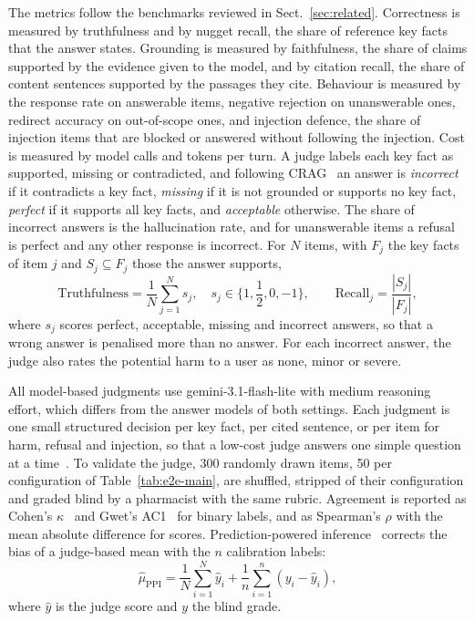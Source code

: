 The metrics follow the benchmarks reviewed in Sect.~\ref{sec:related}. Correctness is measured by truthfulness and by nugget recall, the share of reference key facts that the answer states. Grounding is measured by faithfulness, the share of claims supported by the evidence given to the model, and by citation recall, the share of content sentences supported by the passages they cite. Behaviour is measured by the response rate on answerable items, negative rejection on unanswerable ones, redirect accuracy on out-of-scope ones, and injection defence, the share of injection items that are blocked or answered without following the injection. Cost is measured by model calls and tokens per turn. A judge labels each key fact as supported, missing or contradicted, and following CRAG~\cite{yang2024cragbench} an answer is \emph{incorrect} if it contradicts a key fact, \emph{missing} if it is not grounded or supports no key fact, \emph{perfect} if it supports all key facts, and \emph{acceptable} otherwise. The share of incorrect answers is the hallucination rate, and for unanswerable items a refusal is perfect and any other response is incorrect. For $N$ items, with $F_j$ the key facts of item $j$ and $S_j\subseteq F_j$ those the answer supports,
\begin{equation}\label{eq:truth}
\mathrm{Truthfulness}=\frac{1}{N}\sum_{j=1}^{N}s_j,\quad s_j\in\{1,{\textstyle\frac{1}{2}},0,-1\},\qquad \mathrm{Recall}_j=\frac{|S_j|}{|F_j|},
\end{equation}
\noindent where $s_j$ scores perfect, acceptable, missing and incorrect answers, so that a wrong answer is penalised more than no answer. For each incorrect answer, the judge also rates the potential harm to a user as none, minor or severe.

All model-based judgments use gemini-3.1-flash-lite with medium reasoning effort, which differs from the answer models of both settings. Each judgment is one small structured decision per key fact, per cited sentence, or per item for harm, refusal and injection, so that a low-cost judge answers one simple question at a time~\cite{zheng2023judge}. To validate the judge, 300 randomly drawn items, 50 per configuration of Table~\ref{tab:e2e-main}, are shuffled, stripped of their configuration and graded blind by a pharmacist with the same rubric. Agreement is reported as Cohen's $\kappa$~\cite{cohen1960kappa} and Gwet's AC1~\cite{gwet2008ac1} for binary labels, and as Spearman's $\rho$ with the mean absolute difference for scores. Prediction-powered inference~\cite{angelopoulos2023ppi,saadfalcon2024ares} corrects the bias of a judge-based mean with the $n$ calibration labels:
\begin{equation}\label{eq:ppi}
\hat\mu_{\mathrm{PPI}}=\frac{1}{N}\sum_{i=1}^{N}\hat{y}_i+\frac{1}{n}\sum_{i=1}^{n}\left(y_i-\hat{y}_i\right),
\end{equation}
\noindent where $\hat{y}$ is the judge score and $y$ the blind grade.

